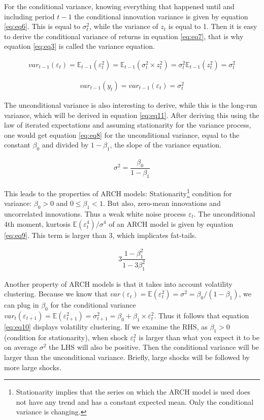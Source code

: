 \documentclass[a4paper, twoside]{templates/ociamthesis}
\begin{document}
\noindent For the conditional variance, knowing everything that happened until and including period \(t-1\) the conditional innovation variance is given by equation \eqref{eq:eq6}. This is equal to \(\sigma_t^2\), while the variance of \(z_t\) is equal to 1. Then it is easy to derive the conditional variance of returns in equation \eqref{eq:eq7}, that is why equation \eqref{eq:eq3} is called the variance equation.

\begin{align} 
var_{t-1}(\varepsilon_t) = \mathbb{E}_{t-1}(\varepsilon_{t}^2) = \mathbb{E}_{t-1}(\sigma_t^2 \times z_t^2) = \sigma_t^2\mathbb{E}_{t-1}(z_t^2) = \sigma_t^2
 \label{eq:eq6}
\end{align} 

\begin{align} 
var_{t-1}(y_t) = var_{t-1}(\varepsilon_t)= \sigma_t^2
 \label{eq:eq7}
\end{align}

\noindent The unconditional variance is also interesting to derive, while this is the long-run variance, which will be derived in equation \eqref{eq:eq11}. After deriving this using the law of iterated expectations and assuming stationarity for the variance process, one would get equation \eqref{eq:eq8} for the unconditional variance, equal to the constant \(\beta_0\) and divided by \(1-\beta_1\), the slope of the variance equation.

\begin{align} 
\sigma^2 = \dfrac{\beta_0}{1-\beta_1}
 \label{eq:eq8}
\end{align}

\noindent This leads to the properties of ARCH models: Stationarity\footnote{Stationarity implies that the series on which the ARCH model is used does not have any trend and has a constant expected mean. Only the conditional variance is changing.} condition for variance: \(\beta_0>0\) and \(0 \le \beta_1 < 1\). But also, zero-mean innovations and uncorrelated innovations. Thus a weak white noise process \(\varepsilon_t\). The unconditional 4th moment, kurtosis \(\mathbb{E}(\varepsilon_t^4)/\sigma^4\) of an ARCH model is given by equation \eqref{eq:eq9}. This term is larger than 3, which implicates fat-tails.

\begin{align} 
3\dfrac{1-\beta_1^2}{1-3\beta_1^2}
 \label{eq:eq9}
\end{align}

\noindent Another property of ARCH models is that it takes into account volatility clustering. Because we know that \(var(\varepsilon_t) = \mathbb{E}(\varepsilon_t^2) = \sigma^2 = \beta_0/(1-\beta_1)\), we can plug in \(\beta_0\) for the conditional variance \(var_t(\varepsilon_{t+1}) = \mathbb{E}(\varepsilon_{t+1}^2) = \sigma_{t+1}^2 = \beta_0 + \beta_1\times\varepsilon_t^2\). Thus it follows that equation \eqref{eq:eq10} displays volatility clustering. If we examine the RHS, as \(\beta_1>0\) (condition for stationarity), when shock \(\varepsilon_t^2\) is larger than what you expect it to be on average \(\sigma^2\) the LHS will also be positive. Then the conditional variance will be larger than the unconditional variance. Briefly, large shocks will be followed by more large shocks.
\end{document}
